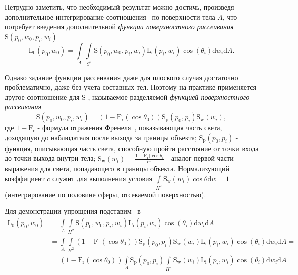 Нетрудно заметить, что необходимый результат можно достичь, произведя
дополнительное интегрирование соотношения~ по
поверхности тела $A$, что потребует введения дополнительной \emph{функции
поверхностного рассеивания} $\mathrm{S}(p_0, w_0, p_i, w_i)$~\cite{SSS}
\begin{equation} \label{math:bssrdf_intensity}
    \mathrm{L_0} (p_0, w_0) = \int\limits_{A^{}} \int\limits_{{S^2}^{}}
                              \mathrm{S}(p_0, w_0, p_i, w_i)
                              \mathrm{L_i}(p_i, w_i) \cos(\theta_i)
                              \mathrm{d} w_i \mathrm{d} A.
\end{equation}

Однако задание функции рассеивания даже для плоского случая достаточно
проблематично, даже без учета составных тел. Поэтому на практике применяется
другое соотношение для S , называемое разделяемой \emph{функцией поверхностного
рассеивания}~\cite{PBRT}
\begin{equation} \label{math:separable_bssrdf}
    \mathrm{S}(p_0, w_0, p_i, w_i) = (1 - \mathrm{F_r}(\cos\theta_0))
                                     \mathrm{S_p}(p_0, p_i) \mathrm{S_w}(w_i),
\end{equation}
где $1 - \mathrm{F_r}$ - формула отражения Френеля~,
показывающая часть света, доходящую до наблюдателя после выхода за границы
объекта; $\mathrm{S_p}(p_0, p_i)$ - функция, описывающая часть света, способную
пройти расстояние от точки входа до точки выхода внутри тела;
$\mathrm{S_w}(w_i) = \frac{1 - \mathrm{F_r}(\cos\theta_i}{c \pi}$ - аналог
первой части выражения для света, попадающего в границы объекта. Нормализующий
коэффициент $c$ служит для выполнения условия
$\int\limits_{{H^2}^{}} \mathrm{S_w}(w_i) \cos\theta \mathrm{d} w = 1$
(интегрирование по половине сферы, отсекаемой поверхностью).

Для демонстрации упрощения подставим~
в~
\begin{align}
    \mathrm{L_0}(p_0, w_0) & = \int\limits_{A^{}} \int\limits_{{H^2}^{}}
                               \mathrm{S}(p_0, w_0, p_i, w_i)
                               \mathrm{L_i}(p_i, w_i) \cos(\theta_i)
                               \mathrm{d} w_i \mathrm{d} A = \nonumber \\
                           & = \int\limits_{A^{}} \int\limits_{{H^2}^{}}
                               (1 - \mathrm{F_r}(\cos\theta_0))
                               \mathrm{S_p}(p_0, p_i) \mathrm{S_w}(w_i)
                               \mathrm{L_i}(p_i, w_i) \cos(\theta_i)
                               \mathrm{d} w_i \mathrm{d} A = \nonumber \\
                           & = (1 - \mathrm{F_r}(\cos\theta_0))
                               \int\limits_{A^{}} \mathrm{S_p}(p_0, p_i)
                               \int\limits_{{H^2}^{}} \mathrm{S_w}(w_i)
                               \mathrm{L_i}(p_i, w_i) \cos(\theta_i)
                               \mathrm{d} w_i \mathrm{d} A
\end{align}

